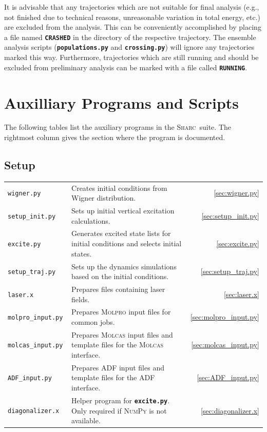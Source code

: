 \documentclass[a4paper,11pt,DIV=15,openany,twoside=false]{scrbook}
\newcommand{\sharc}{\textsc{Sharc}}
\newcommand{\ttt}[1]{\textbf{\texttt{#1}}}
\begin{document}
It is advisable that any trajectories which are not suitable for final analysis (e.g., not finished due to technical reasons, unreasonable variation in total energy, etc.) are excluded from the analysis. 
This can be conveniently accomplished by placing a file named \ttt{CRASHED} in the directory of the respective trajectory. 
The ensemble analysis scripts (\ttt{populations.py} and \ttt{crossing.py}) will ignore any trajectories marked this way.
Furthermore, trajectories which are still running and should be excluded from preliminary analysis can be marked with a file called \ttt{RUNNING}.

\section{Auxilliary Programs and Scripts}

The following tables list the auxiliary programs in the \sharc\ suite. The rightmost column gives the section where the program is documented.

\subsection{Setup}

\begin{tabular}{>{\tt}lp{9.5cm}r}
  wigner.py             &Creates initial conditions from Wigner distribution.                   &\ref{sec:wigner.py}\\
  setup\_init.py        &Sets up initial vertical excitation calculations.                      &\ref{sec:setup_init.py}\\
  excite.py             &Generates excited state lists for initial conditions and selects initial states.                 &\ref{sec:excite.py}\\
  setup\_traj.py        &Sets up the dynamics simulations based on the initial conditions.      &\ref{sec:setup_traj.py}\\
  laser.x               &Prepares files containing laser fields.                                &\ref{sec:laser.x}\\
  molpro\_input.py      &Prepares \textsc{Molpro} input files for common jobs.                  &\ref{sec:molpro_input.py}\\
  molcas\_input.py      &Prepares \textsc{Molcas} input files and template files for the \textsc{Molcas} interface.             &\ref{sec:molcas_input.py}\\
  ADF\_input.py         &Prepares ADF input files and template files for the ADF interface.                     &\ref{sec:ADF_input.py}\\
  diagonalizer.x        &Helper program for \ttt{excite.py}. Only required if \textsc{NumPy} is not available.            &\ref{sec:diagonalizer.x}\\
\end{tabular}
\end{document}

